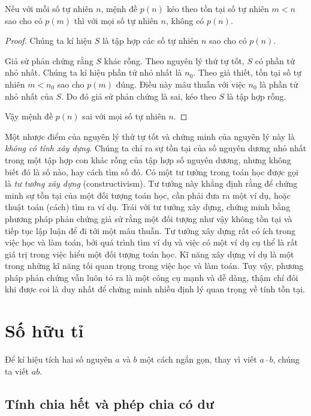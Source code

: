 \begin{theorem}
    Nếu với mỗi số tự nhiên $n$, mệnh đề $p(n)$ kéo theo tồn tại số tự nhiên $m < n$ sao cho có $p(m)$ thì với mọi số tự nhiên $n$, không có $p(n)$.
\end{theorem}

\begin{proof}
    Chúng ta kí hiệu $S$ là tập hợp các số tự nhiên $n$ sao cho có $p(n)$.

    Giả sử phản chứng rằng $S$ khác rỗng. Theo nguyên lý thứ tự tốt, $S$ có phần tử nhỏ nhất. Chúng ta kí hiệu phần tử nhỏ nhất là $n_{0}$. Theo giả thiết, tồn tại số tự nhiên $m < n_{0}$ sao cho $p(m)$ đúng. Điều này mâu thuẫn với việc $n_{0}$ là phần tử nhỏ nhất của $S$. Do đó giả sử phản chứng là sai, kéo theo $S$ là tập hợp rỗng.

    Vậy mệnh đề $p(n)$ sai với mọi số tự nhiên $n$.
\end{proof}

Một nhược điểm của nguyên lý thứ tự tốt và chứng minh của nguyên lý này là \textit{không có tính xây dựng}. Chúng ta chỉ ra sự tồn tại của số nguyên dương nhỏ nhất trong một tập hợp con khác rỗng của tập hợp số nguyên dương, nhưng không biết đó là số nào, hay cách tìm số đó. Có một tư tưởng trong toán học được gọi là \textit{tư tưởng xây dựng} (constructivism). Tư tưởng này khẳng định rằng để chứng minh sự tồn tại của một đối tượng toán học, cần phải đưa ra một ví dụ, hoặc thuật toán (cách) tìm ra ví dụ. Trái với tư tưởng xây dựng, chứng minh bằng phương pháp phản chứng giả sử rằng một đối tượng như vậy không tồn tại và tiếp tục lập luận để đi tới một mâu thuẫn. Tư tưởng xây dựng rất có ích trong việc học và làm toán, bởi quá trình tìm ví dụ và việc có một ví dụ cụ thể là rất giá trị trong việc hiểu một đối tượng toán học. Kĩ năng xây dựng ví dụ là một trong những kĩ năng tối quan trọng trong việc học và làm toán. Tuy vậy, phương pháp phản chứng vẫn luôn tỏ ra là một công cụ mạnh và dễ dàng, thậm chí đôi khi được coi là duy nhất để chứng minh nhiều định lý quan trọng về tính tồn tại.

\section{Số hữu tỉ}\label{section:rationals}

Để kí hiệu tích hai số nguyên $a$ và $b$ một cách ngắn gọn, thay vì viết $a\cdot b$, chúng ta viết $ab$.

\subsection{Tính chia hết và phép chia có dư}

